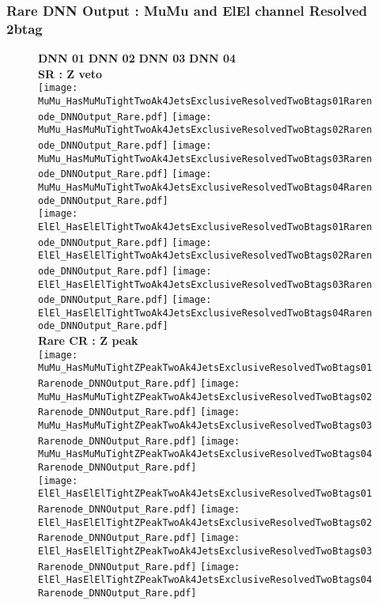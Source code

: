 \documentclass[9pt]{beamer}
\begin{document}
\begin{frame}
	\frametitle{Rare DNN Output : MuMu and ElEl channel Resolved 2btag}
	\begin{figure}
	    \textbf{DNN 01} \hspace{1.2cm} \textbf{DNN 02} \hspace{1.2cm} \textbf{DNN 03} \hspace{1.2cm} \textbf{DNN 04} \\
        \centering
        \textbf{SR : Z veto} \\
		\texttt{[image: MuMu\_HasMuMuTightTwoAk4JetsExclusiveResolvedTwoBtags01Rarenode\_DNNOutput\_Rare.pdf]}
		\texttt{[image: MuMu\_HasMuMuTightTwoAk4JetsExclusiveResolvedTwoBtags02Rarenode\_DNNOutput\_Rare.pdf]}
		\texttt{[image: MuMu\_HasMuMuTightTwoAk4JetsExclusiveResolvedTwoBtags03Rarenode\_DNNOutput\_Rare.pdf]}
		\texttt{[image: MuMu\_HasMuMuTightTwoAk4JetsExclusiveResolvedTwoBtags04Rarenode\_DNNOutput\_Rare.pdf]}\\
		\texttt{[image: ElEl\_HasElElTightTwoAk4JetsExclusiveResolvedTwoBtags01Rarenode\_DNNOutput\_Rare.pdf]}
		\texttt{[image: ElEl\_HasElElTightTwoAk4JetsExclusiveResolvedTwoBtags02Rarenode\_DNNOutput\_Rare.pdf]}
		\texttt{[image: ElEl\_HasElElTightTwoAk4JetsExclusiveResolvedTwoBtags03Rarenode\_DNNOutput\_Rare.pdf]}
		\texttt{[image: ElEl\_HasElElTightTwoAk4JetsExclusiveResolvedTwoBtags04Rarenode\_DNNOutput\_Rare.pdf]}\\
        \textbf{Rare CR : Z peak} \\
		\texttt{[image: MuMu\_HasMuMuTightZPeakTwoAk4JetsExclusiveResolvedTwoBtags01Rarenode\_DNNOutput\_Rare.pdf]}
		\texttt{[image: MuMu\_HasMuMuTightZPeakTwoAk4JetsExclusiveResolvedTwoBtags02Rarenode\_DNNOutput\_Rare.pdf]}
		\texttt{[image: MuMu\_HasMuMuTightZPeakTwoAk4JetsExclusiveResolvedTwoBtags03Rarenode\_DNNOutput\_Rare.pdf]}
		\texttt{[image: MuMu\_HasMuMuTightZPeakTwoAk4JetsExclusiveResolvedTwoBtags04Rarenode\_DNNOutput\_Rare.pdf]}\\
		\texttt{[image: ElEl\_HasElElTightZPeakTwoAk4JetsExclusiveResolvedTwoBtags01Rarenode\_DNNOutput\_Rare.pdf]}
		\texttt{[image: ElEl\_HasElElTightZPeakTwoAk4JetsExclusiveResolvedTwoBtags02Rarenode\_DNNOutput\_Rare.pdf]}
		\texttt{[image: ElEl\_HasElElTightZPeakTwoAk4JetsExclusiveResolvedTwoBtags03Rarenode\_DNNOutput\_Rare.pdf]}
		\texttt{[image: ElEl\_HasElElTightZPeakTwoAk4JetsExclusiveResolvedTwoBtags04Rarenode\_DNNOutput\_Rare.pdf]}\\
	\end{figure}
\end{frame}
\end{document}
